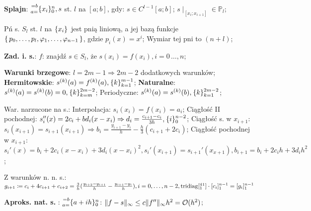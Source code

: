 
\entry
\textbf{Splajn}:
$\ipoints[0][n][a=][=b]{x_i}, s$
st. $l$ na $[a;b]$, gdy:
$s\in C^{l-1}[a;b]$;
$s\mid_{[x_i;x_{i+1}]} \in \mathbb{P}_l$;

\entry
Pń s. $S_l$ st. $l$ na $\ipoints{x_i}$ jest pnią liniową,
a jej bazą funkcje
$\set{p_0, \ldots, p_l, \varphi_1, \ldots, \varphi_{n-1}}$,
gdzie $p_i(x)=x^i$;
\entry
Wymiar tej pni to $(n+l)$;

\entry
\textbf{Zad. i. s.}:
$f$: znajdź $s\in S_l$, że
$s(x_i)=f(x_i), i=0\,\dots,n$;

\entry
\textbf{Warunki brzegowe}:
$l=2m-1 \Rightarrow 2m-2$ dodatkowych warunków;
\entry
\textbf{Hermitowskie}:
$\deriv{s}{k}(a) = \deriv{f}{k}(a), \ipoints[k=1][m-1]{k}$;
\entry
\textbf{Naturalne}:
$\deriv{s}{k}(a)=\deriv{s}{k}(b)=0, \ipoints[k=m][2m-2]{k}$;
\entry
Periodyczne:
$\deriv{s}{k}(a)=\deriv{s}{k}(b), \ipoints[k=1][2m-2]{k}$;

\entry
War. narzucone na s.:
Interpolacja:
$s_i(x_i)=f(x_i)=a_i$;
Ciągłość II pochodnej:
$s_i''(x) = 2c_i+bd_i(x-x_i) \Rightarrow d_i=\frac{c_{i+1} - c_i}{3h}, \ipoints[0][n-2]{i}$;
Ciągłość s. w $x_{i+1}$:
$s_i(x_{i+1}) = s_{i+1}(x_{i+1}) \Rightarrow b_i = \frac{y_{i+1} - y_i}{h} - \frac{h}{3}(c_{i+1} + 2c_i)$;
Ciągłość pochodnej w $x_{i+1}$:
$
s_i'(x) = b_i +2c_i(x - x_i) + 3 d_i (x - x_i)^2,
s_i'(x_{i+1}) = s_{i+1}'(x_{x+1}),
b_{i+1} = b_i + 2 c_i h + 3 d_i h^2
$;

\entry
Z warunków n. n. s.:
$
g_{i+1} \coloneqq
c_i + 4c_{i+1} + c_{i+2} =
\frac{3}{h}(\frac{y_{i+2} - y_{i+1}}{h} - \frac{y_{i+1} - y_{i}}{h}),
i=0,\ldots, n-2,
\mathrm{tridiag}[\prescript{4}{1}{}^{1}] \cdot [c_i]^{n-1}_{1} = [g_i]^{n-1}_{1}
$

\entry
\textbf{Aproks. nat. s. \mancube}:
$\ipoints[0][n][a=][=b]{a+ih}$:
$\|f-s\|_\infty \leq c\|f''\|_\infty h^2 = \mathcal{O}(h^2)$;

